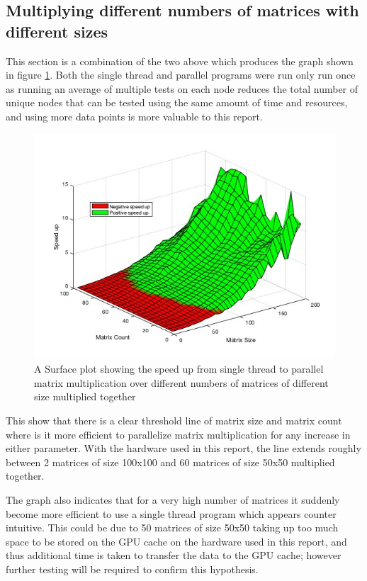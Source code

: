 \subsection{Multiplying different numbers of matrices with different sizes}
This section is a combination of the two above which produces the graph shown in figure \ref{fig:2d}.
Both the single thread and parallel programs were run only run once as running an average of multiple tests on each node reduces the total number of unique nodes that can be tested using the same amount of time and resources, and using more data points is more valuable to this report.

\begin{figure}[H]
    \centering
    \includegraphics[width=1\columnwidth]{Figures/speedupsurf}
    \caption{A Surface plot showing the speed up from single thread to parallel matrix multiplication over different numbers of matrices of different size multiplied together}
    \label{fig:2d}
\end{figure}

This show that there is a clear threshold line of matrix size and matrix count where is it more efficient to parallelize matrix multiplication for any increase in either parameter.
With the hardware used in this report, the line extends roughly between 2 matrices of size 100x100 and 60 matrices of size 50x50 multiplied together.


The graph also indicates that for a very high number of matrices it suddenly become more efficient to use a single thread program which appears counter intuitive.
This could be due to 50 matrices of size 50x50 taking up too much space to be stored on the GPU cache on the hardware used in this report, and thus additional time is taken to transfer the data to the GPU cache; however further testing will be required to confirm this hypothesis.